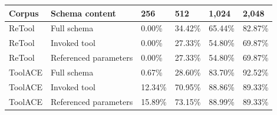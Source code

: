 \begin{tabular}{llllll}
\toprule
Corpus & Schema content & 256 & 512 & 1,024 & 2,048 \\
\midrule
ReTool & Full schema & 0.00\% & 34.42\% & 65.44\% & 82.87\% \\
ReTool & Invoked tool & 0.00\% & 27.33\% & 54.80\% & 69.87\% \\
ReTool & Referenced parameters & 0.00\% & 27.33\% & 54.80\% & 69.87\% \\
ToolACE & Full schema & 0.67\% & 28.60\% & 83.70\% & 92.52\% \\
ToolACE & Invoked tool & 12.34\% & 70.95\% & 88.86\% & 89.33\% \\
ToolACE & Referenced parameters & 15.89\% & 73.15\% & 88.99\% & 89.33\% \\
\bottomrule
\end{tabular}